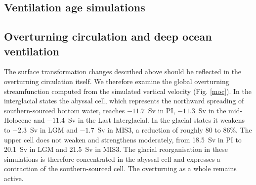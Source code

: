 \documentclass[pdflatex,sn-nature]{sn-jnl}
\begin{document}
\subsection{Ventilation age simulations}




\subsection{Overturning circulation and deep ocean ventilation}

The surface transformation changes described above should be reflected in the overturning circulation itself. We therefore examine the global overturning streamfunction computed from the simulated vertical velocity (Fig. \ref{moc}). In the interglacial states the abyssal cell, which represents the northward spreading of southern-sourced bottom water, reaches $-11.7$~Sv in PI, $-11.3$~Sv in the mid-Holocene and $-11.4$~Sv in the Last Interglacial. In the glacial states it weakens to $-2.3$~Sv in LGM and $-1.7$~Sv in MIS3, a reduction of roughly 80 to 86\%. The upper cell does not weaken and strengthens moderately, from 18.5~Sv in PI to 20.1~Sv in LGM and 21.5~Sv in MIS3. The glacial reorganisation in these simulations is therefore concentrated in the abyssal cell and expresses a contraction of the southern-sourced cell. The overturning as a whole remains active.
\end{document}
